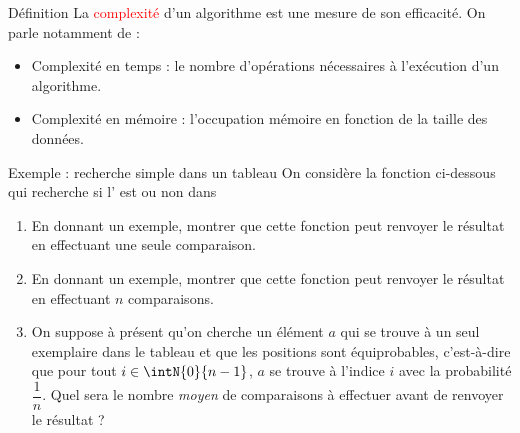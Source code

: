 \documentclass[10pt]{beamer}
\begin{document}
\begin{frame}[fragile]{\Ctitle}{\stitle}
	\begin{alertblock}{Définition}
		La \textcolor{red}{complexité} d'un algorithme est une mesure de son efficacité.
		\onslide<2-> On parle notamment de :
		\begin{itemize}
			\item<3-> Complexité en temps : le nombre d'opérations nécessaires à l'exécution d'un algorithme.
			\item<4-> Complexité en mémoire : l'occupation mémoire en fonction de la taille des données.
		\end{itemize}
	\end{alertblock}
\end{frame}


\begin{frame}[fragile]{\Ctitle}{\stitle}
	\begin{exampleblock}{Exemple : recherche simple dans un tableau}
		{\small On considère la fonction ci-dessous qui recherche si l' est ou non dans {}}
		\begin{enumerate}
			\item<3-> {\small En donnant un exemple, montrer que cette fonction peut renvoyer le résultat en effectuant une seule comparaison.}
			\item<4-> {\small En donnant un exemple, montrer que cette fonction peut renvoyer le résultat en effectuant $n$ comparaisons.}
			\item<5-> {\small On suppose à présent qu'on cherche un élément $a$ qui se trouve à un seul exemplaire dans le tableau et que les positions sont équiprobables, c'est-à-dire que pour tout $i \in \intN{0}{n-1}$, $a$ se trouve à l'indice $i$ avec la probabilité $\dfrac{1}{n}$. Quel sera le nombre \textit{moyen} de comparaisons à effectuer avant de renvoyer le résultat ?}
		\end{enumerate}
	\end{exampleblock}
\end{frame}
\end{document}
